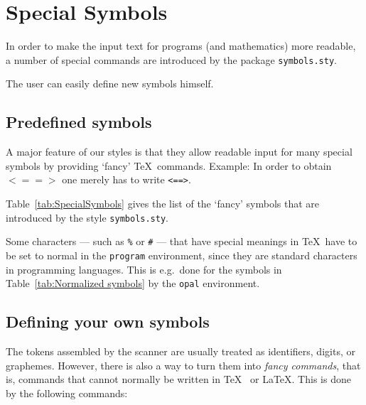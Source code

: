 

\section{Special Symbols}


In order to make the input text for programs (and mathematics) more
readable, a number of special commands are introduced by the package
\verb+symbols.sty+.

The user can easily define new symbols himself.


\subsection{Predefined symbols}

A major feature of our styles is that they allow readable input for many
special symbols by providing `fancy' \TeX~commands. Example: In order to
obtain \(<==>\) one merely has to write \verb+<==>+.

Table~\ref{tab:SpecialSymbols} gives the list of the `fancy' symbols that
are introduced by the style \texttt{symbols.sty}.

Some characters --- such as \verb+%+ or \verb+#+ --- that have special
meanings in \TeX\ have to be set to normal in the \texttt{program}
environment, since they are standard characters in programming languages.
This is e.g.~done for the symbols in Table~\ref{tab:Normalized symbols} by
the \texttt{opal} environment.




\subsection{Defining your own symbols}

The tokens assembled by the scanner are usually treated as identifiers,
digits, or graphemes. However, there is also a way to turn them into
\emph{fancy commands}, that is, commands that cannot normally be written in
\TeX~ or \LaTeX. This is done by the following commands:


